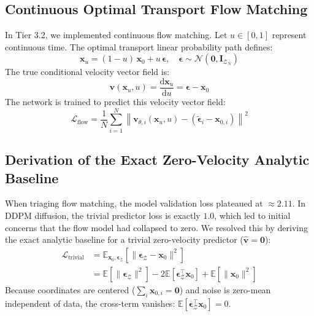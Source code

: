 \documentclass[12pt, a4paper]{article}
\begin{document}
\subsection{Continuous Optimal Transport Flow Matching}
In Tier 3.2, we implemented continuous flow matching. Let $u \in [0, 1]$ represent continuous time. The optimal transport linear probability path defines:
\begin{equation}
    \mathbf{x}_u = (1 - u)\,\mathbf{x}_0 + u\,\boldsymbol{\epsilon}, \quad \boldsymbol{\epsilon} \sim \mathcal{N}(\mathbf{0}, \mathbf{I}_{\mathcal{Z}_N})
\end{equation}
The true conditional velocity vector field is:
\begin{equation}
    \mathbf{v}(\mathbf{x}_u, u) = \frac{\mathrm{d}\mathbf{x}_u}{\mathrm{d}u} = \boldsymbol{\epsilon} - \mathbf{x}_0
\end{equation}
The network is trained to predict this velocity vector field:
\begin{equation}
    \mathcal{L}_\text{flow} = \frac{1}{N} \sum_{i=1}^N \left\| \mathbf{v}_{\theta, i}(\mathbf{x}_u, u) - (\tilde{\boldsymbol{\epsilon}}_i - \mathbf{x}_{0, i}) \right\|^2
\end{equation}

\subsection{Derivation of the Exact Zero-Velocity Analytic Baseline}
When triaging flow matching, the model validation loss plateaued at $\approx 2.11$. In DDPM diffusion, the trivial predictor loss is exactly $1.0$, which led to initial concerns that the flow model had collapsed to zero. We resolved this by deriving the exact analytic baseline for a trivial zero-velocity predictor ($\hat{\mathbf{v}} = \mathbf{0}$):
\begin{align}
    \mathcal{L}_\text{trivial} &= \mathbb{E}_{\mathbf{x}_0, \boldsymbol{\epsilon}_{\mathcal{Z}}}\left[ \|\boldsymbol{\epsilon}_{\mathcal{Z}} - \mathbf{x}_0\|^2 \right] \\
    &= \mathbb{E}\left[ \|\boldsymbol{\epsilon}_{\mathcal{Z}}\|^2 \right] - 2\mathbb{E}\left[ \boldsymbol{\epsilon}_{\mathcal{Z}}^\top \mathbf{x}_0 \right] + \mathbb{E}\left[ \|\mathbf{x}_0\|^2 \right]
\end{align}
Because coordinates are centered ($\sum_i \mathbf{x}_{0, i} = \mathbf{0}$) and noise is zero-mean independent of data, the cross-term vanishes: $\mathbb{E}[\boldsymbol{\epsilon}_{\mathcal{Z}}^\top \mathbf{x}_0] = 0$.
\end{document}
